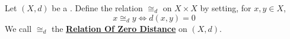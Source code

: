 \label{def:relationofzerodistance}
\newcommand{\RelationOfZeroDistance}[0]{\textbf{\hyperref[def:relationofzerodistance]{Relation Of Zero Distance}}\xspace}
\begin{df}
    Let $(X,d)$ be a \PseudometricSpace. 
    Define the relation  $\cong_d$ on $X \times X$ by setting, for $x,y \in X$, 
    \begin{equation}
        x \cong_d y \iff d(x,y) = 0
    \end{equation}
    We call $\cong_d$ the \RelationOfZeroDistance on $(X,d)$. 
\end{df}
